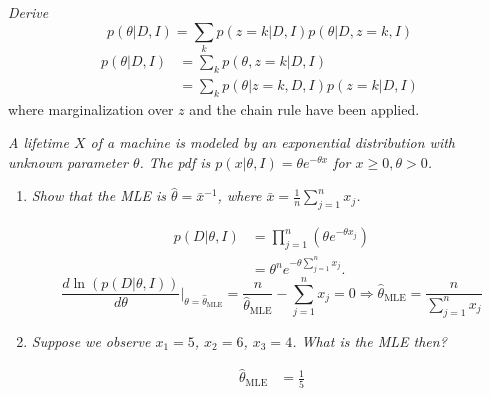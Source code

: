 \begin{example}
	\emph{Derive}
	\begin{equation}
		p(\theta|D,I) = \sum_k p(z=k|D,I)p(\theta|D,z=k,I)
	\end{equation}
	\begin{equation}
		\begin{split}
			p(\theta|D,I) &= \sum_kp(\theta,z=k|D,I)\\
			&=\sum_kp(\theta|z=k,D,I)p(z=k|D,I)
		\end{split}
	\end{equation}
	where marginalization over $z$ and the chain rule have been applied.
\end{example}

\begin{example}
	\emph{A lifetime $X$ of a machine is modeled by an exponential distribution with unknown parameter $\theta$. The pdf is $p(x|\theta,I)=\theta e^{-\theta x}$ for $x\geq 0,\theta >0$.}
	\begin{enumerate}
		\item \emph{Show that the MLE is $\hat{\theta}=\bar{x}^{-1}$, where $\bar{x}=\frac{1}{n}\sum_{j=1}^nx_j$.}
		
		\begin{equation}
			\begin{split}
				p(D|\theta,I) &= \prod_{j=1}^{n}(\theta e^{-\theta x_j})\\
				&= \theta^ne^{-\theta \sum_{j=1}^nx_j}.
			\end{split}
		\end{equation}
		\begin{equation}
			\frac{d\ln(p(D|\theta,I))}{d\theta }\bigg|_{\theta = \hat{\theta}_{\text{MLE}}} = \frac{n}{\hat{\theta}_{\text{MLE}}} -\sum_{j=1}^nx_j =0 \Rightarrow \hat{\theta}_{\text{MLE}} = \frac{n}{\sum_{j=1}^nx_j}
		\end{equation}
		
		\item \emph{Suppose we observe $x_1 = 5$, $x_2=6$, $x_3=4$. What is the MLE then?}
		
		\begin{equation}
			\begin{split}
				\hat{\theta}_{\text{MLE}} & = \frac{1}{5}
			\end{split}
		\end{equation}
		

\end{enumerate}
\end{example}
